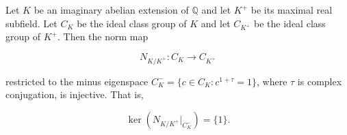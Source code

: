 Let $K$ be an imaginary abelian extension of $\mathbb{Q}$ and let $K^+$ be its maximal real subfield. Let $C_K$ be the ideal class group of $K$ and let $C_{K^+}$ be the ideal class group of $K^+$. Then the norm map

$$
N_{K/K^+}: C_K \longrightarrow C_{K^+}
$$

restricted to the minus eigenspace $C_K^- = \{ c \in C_K : c^{1+\tau} = 1 \}$, where $\tau$ is complex conjugation, is injective. That is,

$$
\ker( N_{K/K^+} |_{C_K^-} ) = \{1\}.
$$
